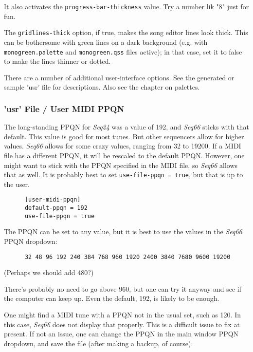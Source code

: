    It also activates the \texttt{progress-bar-thickness} value.
   Try a number lik "8" just for fun.

   The \texttt{gridlines-thick} option, if true, makes the song
   editor lines look thick.
   This can be bothersome with green lines on a dark background
   (e.g. with \texttt{monogreen.palette} and \texttt{monogreen.qss}
   files active); in that case, set it to false to make the lines thinner
   or dotted.

   There are a number of additional user-interface options.  See the generated
   or sample 'usr' file for descriptions.  Also see the chapter on palettes.

\subsubsection{'usr' File / User MIDI PPQN}
\label{subsubsec:usr_file_user_midi_ppqn}

   The long-standing PPQN for \textsl{Seq24} was a value of 192, and
   \textsl{Seq66} sticks with that default.
   This value is good for most tunes. But other sequencers allow for higher
   values. \textsl{Seq66} allows for some crazy values, ranging from
   32 to 19200.  If a MIDI file has a different PPQN, it will be rescaled to
   the default PPQN.  However, one might want to stick with the PPQN
   specified in the MIDI file, so \textsl{Seq66} allows that as well.
   It is probably best to set \texttt{use-file-ppqn = true}, but that is
   up to the user.

   \begin{verbatim}
      [user-midi-ppqn]
      default-ppqn = 192
      use-file-ppqn = true
   \end{verbatim}

   The PPQN can be set to any value, but it is best to use the values
   in the \textsl{Seq66} PPQN dropdown:

   \begin{verbatim}
      32 48 96 192 240 384 768 960 1920 2400 3840 7680 9600 19200
   \end{verbatim}

   (Perhaps we should add 480?)

   There's probably no need to go above 960, but one can try it anyway and see
   if the computer can keep up. Even the default, 192, is likely to be enough.

   One might find a MIDI tune with a PPQN not in the usual set, such as
   120. In this case, \textsl{Seq66} does not display that properly.
   This is a difficult issue to fix at present. If not an issue, one
   can change the PPQN in the main window PPQN dropdown, and save the
   file (after making a backup, of course).

